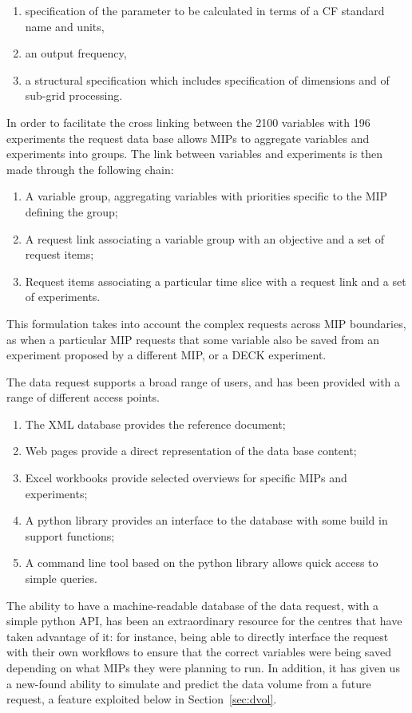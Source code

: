 \documentclass[gmd,manuscript]{copernicus}
\newcommand{\secref}[1] {\mbox{Section  \ref{sec:#1}}}
\begin{document}
\begin{enumerate}
\item specification of the parameter to be calculated in terms of a CF
  standard name and units,
\item an output frequency,
\item a structural specification which includes specification of
  dimensions and of sub-grid processing.
\end{enumerate}

In order to facilitate the cross linking between the 2100 variables
with 196 experiments the request data base allows MIPs to aggregate
variables and experiments into groups. The link between variables and
experiments is then made through the following chain:

\begin{enumerate}
\item A variable group, aggregating variables with priorities specific
  to the MIP defining the group;
\item A request link associating a variable group with an objective and
  a set of request items;
\item Request items associating a particular time slice with a
  request link and a set of experiments.
\end{enumerate}

This formulation takes into account the complex requests across MIP
boundaries, as when a particular MIP requests that some variable also
be saved from an experiment proposed by a different MIP, or a DECK
experiment.

The data request supports a broad range of users, and has been
provided with a range of different access points.

\begin{enumerate}
\item The XML database provides the reference document;
\item Web pages provide a direct representation of the data base
  content;
\item Excel workbooks provide selected overviews for specific MIPs and
  experiments;
\item A python library provides an interface to the database with some
  build in support functions;
\item A command line tool based on the python library allows quick
  access to simple queries.
\end{enumerate}


The ability to have a machine-readable database of the data request,
with a simple python API, has been an extraordinary resource for the
centres that have taken advantage of it: for instance, being able to
directly interface the request with their own workflows to ensure that
the correct variables were being saved depending on what MIPs they
were planning to run. In addition, it has given us a new-found ability
to simulate and predict the data volume from a future request, a
feature exploited below in \secref{dvol}.
\end{document}
